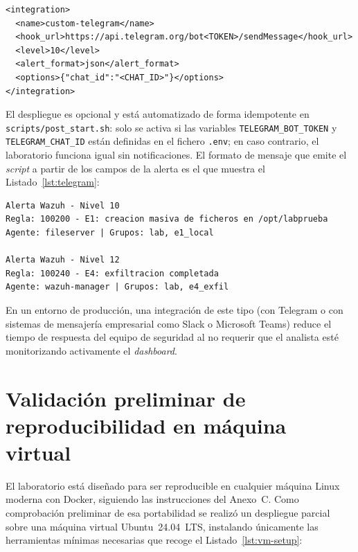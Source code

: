 \documentclass[../main.tex]{subfiles}
\begin{document}
\begin{lstlisting}[style=bash, caption={Bloque de configuración de la integración
  en ossec.conf del manager.}, label={lst:telegram-conf}]
<integration>
  <name>custom-telegram</name>
  <hook_url>https://api.telegram.org/bot<TOKEN>/sendMessage</hook_url>
  <level>10</level>
  <alert_format>json</alert_format>
  <options>{"chat_id":"<CHAT_ID>"}</options>
</integration>
\end{lstlisting}

El despliegue es opcional y está automatizado de forma idempotente en
\texttt{scripts/post\_start.sh}: solo se activa si las variables
\texttt{TELEGRAM\_BOT\_TOKEN} y \texttt{TELEGRAM\_CHAT\_ID} están definidas en el
fichero \texttt{.env}; en caso contrario, el laboratorio funciona igual sin
notificaciones. El formato de mensaje que emite el \emph{script} a partir de los
campos de la alerta es el que muestra el Listado~\ref{lst:telegram}:

\begin{lstlisting}[style=bash, caption={Formato de las notificaciones de Telegram
  generadas por la integración a partir de una alerta Wazuh.}, label={lst:telegram}]
Alerta Wazuh - Nivel 10
Regla: 100200 - E1: creacion masiva de ficheros en /opt/labprueba
Agente: fileserver | Grupos: lab, e1_local

Alerta Wazuh - Nivel 12
Regla: 100240 - E4: exfiltracion completada
Agente: wazuh-manager | Grupos: lab, e4_exfil
\end{lstlisting}

En un entorno de producción, una integración de este tipo (con Telegram o con
sistemas de mensajería empresarial como Slack o Microsoft Teams) reduce el tiempo
de respuesta del equipo de seguridad al no requerir que el analista esté
monitorizando activamente el \emph{dashboard}.

\section{Validación preliminar de reproducibilidad en máquina virtual}
\label{sec:vm-reproducibilidad}

El laboratorio está diseñado para ser reproducible en cualquier máquina Linux
moderna con Docker, siguiendo las instrucciones del Anexo~C. Como comprobación
preliminar de esa portabilidad se realizó un despliegue parcial sobre una máquina
virtual Ubuntu~24.04~LTS, instalando únicamente las herramientas mínimas
necesarias que recoge el Listado~\ref{lst:vm-setup}:
\end{document}
